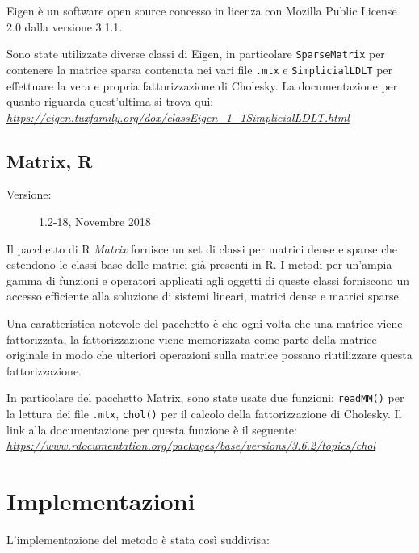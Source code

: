 \documentclass[preprint,12pt]{elsarticle}
\begin{document}
Eigen è un software open source concesso in licenza con Mozilla Public License 2.0 dalla versione 3.1.1.

Sono state utilizzate diverse classi di Eigen, in particolare \texttt{SparseMatrix} per contenere la matrice sparsa contenuta nei vari file \texttt{.mtx} e \texttt{SimplicialLDLT} per effettuare la vera e propria fattorizzazione di Cholesky.
La documentazione per quanto riguarda quest'ultima si trova qui:\\
\textit{\href{https://eigen.tuxfamily.org/dox/classEigen_1_1SimplicialLDLT.html}{https://eigen.tuxfamily.org/dox/classEigen\_1\_1SimplicialLDLT.html} }


\subsection*{Matrix, R}
\medskip
\begin{description}
	\item[Versione:] 1.2-18, Novembre 2018
\end{description}

Il pacchetto di R \textit{Matrix} fornisce un set di classi per matrici dense e sparse che estendono le classi base delle matrici già presenti in R. I metodi per un'ampia gamma di funzioni e operatori applicati agli oggetti di queste classi forniscono un accesso efficiente alla soluzione di sistemi lineari, matrici dense e matrici sparse.

Una caratteristica notevole del pacchetto è che ogni volta che una matrice viene fattorizzata, la fattorizzazione viene memorizzata come parte della matrice originale in modo che ulteriori operazioni sulla matrice possano riutilizzare questa fattorizzazione.

In particolare del pacchetto Matrix, sono state usate due funzioni: \texttt{readMM()} per la lettura dei file \texttt{.mtx}, \texttt{chol()} per il calcolo della fattorizzazione di Cholesky.
Il link alla documentazione per questa funzione è il seguente:\\
\textit{\href{https://www.rdocumentation.org/packages/base/versions/3.6.2/topics/chol}{https://www.rdocumentation.org/packages/base/versions/3.6.2/topics/chol}
}
\newpage


\section*{Implementazioni}

L'implementazione del metodo è stata così suddivisa:
\end{document}

